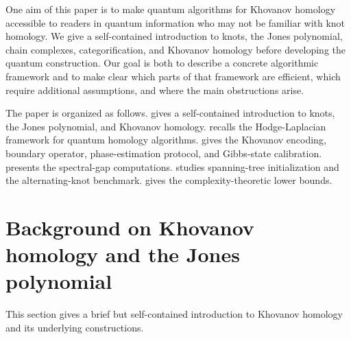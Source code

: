 \documentclass[a4paper,onecolumn,unpublished]{quantumarticle}
\theoremstyle{plain}
\theoremstyle{definition}
\theoremstyle{definition}
\numberwithin{equation}{section}
\begin{document}
 One aim of this paper is to make quantum algorithms for Khovanov homology accessible to readers in quantum information who may not be familiar with knot homology.  We give a self-contained introduction to knots, the Jones polynomial, chain complexes, categorification, and Khovanov homology before developing the quantum construction.  Our goal is both to describe a concrete algorithmic framework and to make clear which parts of that framework are efficient, which require additional assumptions, and where the main obstructions arise.

The paper is organized as follows.   gives a self-contained introduction to knots, the Jones polynomial, and Khovanov homology.   recalls the Hodge-Laplacian framework for quantum homology algorithms.   gives the Khovanov encoding, boundary operator, phase-estimation protocol, and Gibbs-state calibration.   presents the spectral-gap computations.   studies spanning-tree initialization and the alternating-knot benchmark.   gives the complexity-theoretic lower bounds.


\section{Background on Khovanov homology and the Jones polynomial}\label{sec:bg_khovanov}
\label{sec:background}
This section gives a brief but self-contained introduction to Khovanov homology and its underlying constructions.
\end{document}
